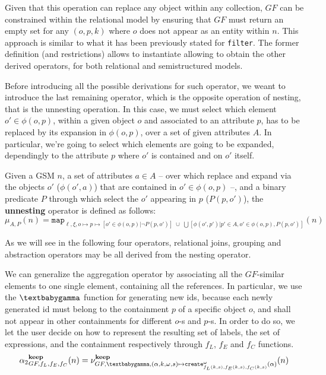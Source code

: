 Given that this operation can replace any object within any collection, $GF$ can be constrained within the relational model by ensuring that $GF$ must return an empty set for any $(o,p,k)$ where $o$ does not appear as an entity within $n$. This approach is similar to what it has been previously stated for \texttt{filter}. The former definition (and restrictions) allows to instantiate allowing to obtain the other derived operators, for both relational and semistructured models. 


Before introducing all the possible derivations for such operator, we weant to introduce the last remaining operator, which is the opposite operation of nesting, that is the unnesting operation. In this case, we must select which element $o'\in\phi(o,p)$, within a given object $o$ and associated to an attribute $p$, has to be replaced by its expansion in $\phi(o,p)$, over a set of given attributes $A$. In particular, we're going to select which elements are going to be expanded, dependingly to the attribute $p$ where $o'$ is contained and on $o'$ itself.

\begin{definition}[Unnesting]
	Given a GSM $n$, a set of attributes $a\in A$ -- over which replace and expand via the objects $o'$ ($\phi(o',a)$) that are contained in $o'\in\phi(o,p)$ --, and a binary predicate $P$ through which select the $o'$ appearing in $p$ ($P(p,o')$), the \textbf{unnesting}  operator is defined as follows:
	\[\mu_{A,P}(n)=\texttt{map}_{\ell,\xi,o\mapsto p\mapsto [o'\in\phi(o,p)|\neg P(p,o')]\;\cup\;\bigcup[\phi(o',p')|p'\in A, o'\in\phi(o,p), P(p,o')]}(n)\]
\end{definition}

As we will see in the following four operators, relational joins, grouping and abstraction operators may be all derived from the nesting operator.

We can generalize the aggregation operator by associating all the $GF$-similar elements to one single element, containing all the references. In particular, we use the $\genp$ function for generating new ids, because each newly generated id must belong to the containment $p$ of a specific object $o$, and shall not appear in other containments for different $o$-s and $p$-s. In order to do so, we let the user decide on how to represent the resulting set of labels, the set of expressions, and the containment respectively through $f_L$, $f_E$ and $f_C$ functions. 
\[{\alpha_2}_{GF,f_L,f_E,f_C}^{\textbf{keep}}(n)=\nu^{\textbf{keep}}_{GF,\genp,(\alpha,k,\omega,s)\mapsto \texttt{create}^\omega_{f_L(k,s),f_E(k,s),f_C(k, s)}(\alpha)}(n)\]



